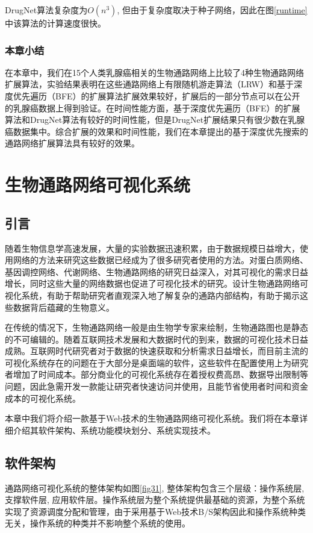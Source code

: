 DrugNet算法复杂度为$O(n^{3})$, 但由于复杂度取决于种子网络，因此在图\ref{runtime}中该算法的计算速度很快。

\subsection{本章小结}
在本章中，我们在15个人类乳腺癌相关的生物通路网络上比较了4种生物通路网络扩展算法，实验结果表明在这些通路网络上有限随机游走算法（LRW）和基于深度优先遍历（BFE）的扩展算法扩展效果较好，扩展后的一部分节点可以在公开的乳腺癌数据上得到验证。在时间性能方面，基于深度优先遍历（BFE）的扩展算法和DrugNet算法有较好的时间性能，但是DrugNet扩展结果只有很少数在乳腺癌数据集中。综合扩展的效果和时间性能，我们在本章提出的基于深度优先搜索的通路网络扩展算法具有较好的效果。


\chapter{生物通路网络可视化系统}
\section{引言}
随着生物信息学高速发展，大量的实验数据迅速积累，由于数据规模日益增大，使用网络的方法来研究这些数据已经成为了很多研究者使用的方法。对蛋白质网络、基因调控网络、代谢网络、生物通路网络的研究日益深入，对其可视化的需求日益增长，同时这些大量的网络数据也促进了可视化技术的研究。设计生物通路网络可视化系统，有助于帮助研究者直观深入地了解复杂的通路内部结构，有助于揭示这些数据背后蕴藏的生物意义。

在传统的情况下，生物通路网络一般是由生物学专家来绘制，生物通路图也是静态的不可编辑的。随着互联网技术发展和大数据时代的到来，数据的可视化技术日益成熟。互联网时代研究者对于数据的快速获取和分析需求日益增长，而目前主流的可视化系统存在的问题在于大部分是桌面端的软件，这些软件在配置使用上为研究者增加了时间成本。部分商业化的可视化系统存在着授权费高昂、数据导出限制等问题，因此急需开发一款能让研究者快速访问并使用，且能节省使用者时间和资金成本的可视化系统。

本章中我们将介绍一款基于Web技术的生物通路网络可视化系统。我们将在本章详细介绍其软件架构、系统功能模块划分、系统实现技术。

\section{软件架构}
通路网络可视化系统的整体架构如图\ref{fig31}, 整体架构包含三个层级：操作系统层,支撑软件层, 应用软件层。操作系统层为整个系统提供最基础的资源，为整个系统实现了资源调度分配和管理，由于采用基于Web技术B/S架构因此和操作系统种类无关，操作系统的种类并不影响整个系统的使用。

